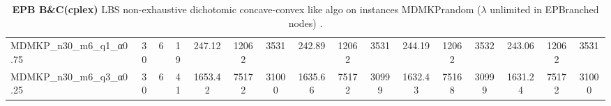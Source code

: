 \begin{sidewaystable}[!ht]
{\begin{tabular}{lccccccccccccccc}
MDMKP\_n30\_m6\_q1\_α0.75 & 30 & 6 & 19 & 247.12 & 12062 & 3531 & 242.89 & 12062 & 3531 & 244.19 & 12062 & 3532 & 243.06 & 12062 & 3531 \\
MDMKP\_n30\_m6\_q3\_α0.25 & 30 & 6 & 41 & 1653.42 & 75172 & 31000 & 1635.66 & 75172 & 30999 & 1632.43 & 75168 & 30999 & 1631.24 & 75172 & 31000 \\
\bottomrule
\end{tabular}
}%
\caption{\textbf{EPB B\&C(cplex) }LBS non-exhaustive dichotomic concave-convex like algo on instances MDMKPrandom ($\lambda$ unlimited in EPBranched nodes) .}
\label{tab:table_lambda_EPB_MDMKPrandom }
\end{sidewaystable}
